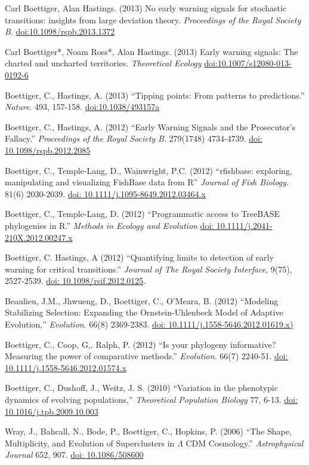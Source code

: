 \documentclass[margin]{res}
\begin{document}
\begin{resume}
\begin{etaremune}[start = 11]
\item  Carl Boettiger, Alan Hastings. (2013) No early warning signals for stochastic transitions: insights from large deviation theory. {\it Proceedings of the Royal Society B}. \href{http://doi.org/10.1098/rspb.2013.1372}{doi:10.1098/rspb.2013.1372}
\item  Carl Boettiger*, Noam Ross*, Alan Hastings. (2013) Early warning signals: The charted and uncharted territories. {\it Theoretical Ecology} \href{http://doi.org/10.1007/s12080-013-0192-6}{doi:10.1007/s12080-013-0192-6}
\item  Boettiger, C., Hastings, A. (2013) ``Tipping points: From patterns to predictions.'' {\it Nature}. 493, 157-158. \href{http://dx.doi.org/10.1038/493157a}{doi:10.1038/493157a}
\item Boettiger, C., Hastings, A. (2012) ``Early Warning Signals and the Prosecutor's Fallacy.'' {\it Proceedings of the Royal Society B}. 279(1748) 4734-4739.   \href{http://dx.doi.org/10.1098/rspb.2012.2085}{doi: 10.1098/rspb.2012.2085}
\item Boettiger, C., Temple-Lang, D., Wainwright, P.C. (2012) ``rfishbase: exploring, manipulating and visualizing FishBase data from R'' {\it Journal of Fish Biology}. 81(6) 2030-2039. \href{http://dx.doi.org/10.1111/j.1095-8649.2012.03464.x}{doi: 10.1111/j.1095-8649.2012.03464.x}
\item Boettiger, C., Temple-Lang, D. (2012)  ``Programmatic access to TreeBASE phylogenies in R.'' {\it Methods in Ecology and Evolution}  \href{http://dx.doi.org/10.1111/j.2041-210X.2012.00247.x}{doi: 10.1111/j.2041-210X.2012.00247.x}
\item Boettiger, C. Hastings, A (2012) ``Quantifying limits to detection of early warning for critical transitions.'' {\it Journal of The Royal Society Interface},  9(75), 2527-2539. \href{http://dx.doi.org/10.1098/rsif.2012.0125}{doi: 10.1098/rsif.2012.0125}.
\item Beaulieu, J.M., Jhwueng, D., Boettiger, C., O'Meara, B. (2012) ``Modeling Stabilizing Selection: Expanding the Ornstein-Uhlenbeck Model of Adaptive Evolution,'' {\it Evolution}. 66(8) 2369-2383. \href{http://dx.doi.org/10.1111/j.1558-5646.2012.01619.x}{doi: 10.1111/j.1558-5646.2012.01619.x)}
\item Boettiger, C., Coop, G,. Ralph, P. (2012) ``Is your phylogeny informative? Measuring the power of comparative methods.'' {\it Evolution}. 66(7) 2240-51. \href{http://dx.doi.org/10.1111/j.1558-5646.2012.01574.x}{doi: 10.1111/j.1558-5646.2012.01574.x}
\item Boettiger, C., Dushoff, J., Weitz, J. S. (2010) ``Variation in the phenotypic dynamics of evolving populations,'' {\it Theoretical Population Biology} 77, 6-13. \href{http://dx.doi.org/10.1016/j.tpb.2009.10.003}{doi: 10.1016/j.tpb.2009.10.003}
\item Wray, J., Bahcall, N., Bode, P., Boettiger, C., Hopkins, P.  (2006)  ``The Shape, Multiplicity, and Evolution of Superclusters in $\Lambda$ CDM Cosmology.''  {\it Astrophysical Journal} 652, 907. \href{http://dx.doi.org/10.1086/508600}{doi: 10.1086/508600}
\end{etaremune}


\end{resume}
\end{document}

